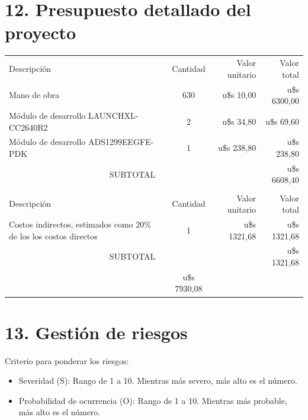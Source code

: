 \documentclass[
11pt, %
codirector, %
]{charter}
\begin{document}


\section{12. Presupuesto detallado del proyecto}
\label{sec:presupuesto}

\begin{table}[htpb]
\centering
\begin{tabularx}{\linewidth}{@{}|X|c|r|r|@{}}
\hline
\rowcolor[HTML]{C0C0C0} 
\multicolumn{4}{|c|}{\cellcolor[HTML]{C0C0C0}COSTOS DIRECTOS} \\ \hline
\rowcolor[HTML]{C0C0C0} 
 Descripción & Cantidad & Valor unitario & Valor total \\ \hline

 Mano de obra & 630 & u\$s 10,00 & u\$s 6300,00 \\ \hline
 Módulo de desarrollo LAUNCHXL-CC2640R2 & 2 & u\$s 34,80 & u\$s 69,60 \\ \hline
 Módulo de desarrollo ADS1299EEGFE-PDK & 1 & u\$s 238,80 & u\$s 238,80 \\ \hline
\multicolumn{3}{|c|}{SUBTOTAL} & u\$s 6608,40 \\ \hline
\rowcolor[HTML]{C0C0C0} 
\multicolumn{4}{|c|}{\cellcolor[HTML]{C0C0C0}COSTOS INDIRECTOS} \\ \hline
\rowcolor[HTML]{C0C0C0} 
 Descripción & Cantidad & Valor unitario & Valor total \\ \hline

 Costos indirectos, estimados como 20\% de los los costos directos & 1 & u\$s 1321,68  & u\$s 1321,68  \\ \hline

\multicolumn{3}{|c|}{SUBTOTAL} & u\$s 1321,68 \\ \hline
\rowcolor[HTML]{C0C0C0}
\multicolumn{3}{|c|}{TOTAL} & u\$s 7930,08   \\ \hline
\end{tabularx}%
\end{table}


\section{13. Gestión de riesgos}
\label{sec:riesgos}

Criterio para ponderar los riesgos:
\begin{itemize}
	\item Severidad (S): Rango de 1 a 10. Mientras más severo, más alto es el número.
	\item Probabilidad de ocurrencia (O): Rango de 1 a 10. Mientras más probable, más alto es el número.
\end{itemize}
\end{document}

